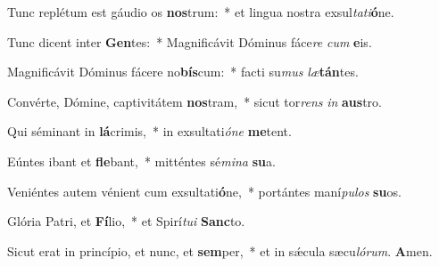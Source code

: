 Tunc replétum est gáudio os \textbf{nos}trum:~* et lingua nostra exsul\textit{ta}\textit{ti}\textbf{ó}ne.

Tunc dicent inter \textbf{Gen}tes:~* Magnificávit Dóminus fáce\textit{re} \textit{cum} \textbf{e}is.

Magnificávit Dóminus fácere no\textbf{bís}cum:~* facti su\textit{mus} \textit{læ}\textbf{tán}tes.

Convérte, Dómine, captivitátem \textbf{nos}tram,~* sicut tor\textit{rens} \textit{in} \textbf{aus}tro.

Qui séminant in \textbf{lá}crimis,~* in exsultati\textit{ó}\textit{ne} \textbf{me}tent.

Eúntes ibant et \textbf{fle}bant,~* mitténtes sé\textit{mi}\textit{na} \textbf{su}a.

Veniéntes autem vénient cum exsultati\textbf{ó}ne,~* portántes maní\textit{pu}\textit{los} \textbf{su}os.

Glória Patri, et \textbf{Fí}lio,~* et Spirí\textit{tu}\textit{i} \textbf{Sanc}to.

Sicut erat in princípio, et nunc, et \textbf{sem}per,~* et in sǽcula sæcu\textit{ló}\textit{rum}. \textbf{A}men.

